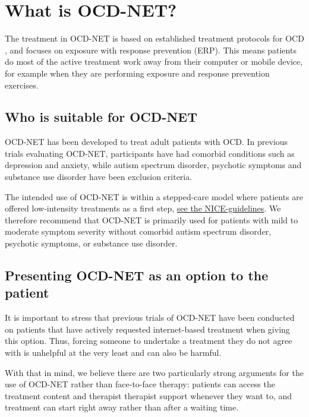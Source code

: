 \documentclass[]{book}
\theoremstyle{definition}
\theoremstyle{definition}
\theoremstyle{definition}
\theoremstyle{remark}
\begin{document}
\hypertarget{what-is-ocd-net}{%
\section{What is OCD-NET?}\label{what-is-ocd-net}}

The treatment in OCD-NET is based on established treatment protocols for
OCD \citep{foa2012}, and focuses on exposure with response prevention
(ERP). This means patients do most of the active treatment work away
from their computer or mobile device, for example when they are
performing exposure and response prevention exercises.

\hypertarget{who-is-suitable-for-ocd-net}{%
\subsection{Who is suitable for
OCD-NET}\label{who-is-suitable-for-ocd-net}}

OCD-NET has been developed to treat adult patients with OCD. In previous
trials evaluating OCD-NET, participants have had comorbid conditions
such as depression and anxiety, while autism spectrum disorder,
psychotic symptoms and substance use disorder have been exclusion
criteria.

The intended use of OCD-NET is within a stepped-care model where
patients are offered low-intensity treatments as a first step,
\href{https://www.nice.org.uk/guidance/CG31/chapter/1-Guidance\#stepped-care-for-adults-young-people-and-children-with-ocd-or-bdd}{see
the NICE-guidelines}. We therefore recommend that OCD-NET is primarily
used for patients with mild to moderate symptom severity without
comorbid autism spectrum disorder, psychotic symptoms, or substance use
disorder.

\hypertarget{presenting-ocd-net-as-an-option-to-the-patient}{%
\subsection{Presenting OCD-NET as an option to the
patient}\label{presenting-ocd-net-as-an-option-to-the-patient}}

It is important to stress that previous trials of OCD-NET have been
conducted on patients that have actively requested internet-based
treatment when giving this option. Thus, forcing someone to undertake a
treatment they do not agree with is unhelpful at the very least and can
also be harmful.

With that in mind, we believe there are two particularly strong
arguments for the use of OCD-NET rather than face-to-face therapy:
patients can access the treatment content and therapist therapist
support whenever they want to, and treatment can start right away rather
than after a waiting time.
\end{document}
